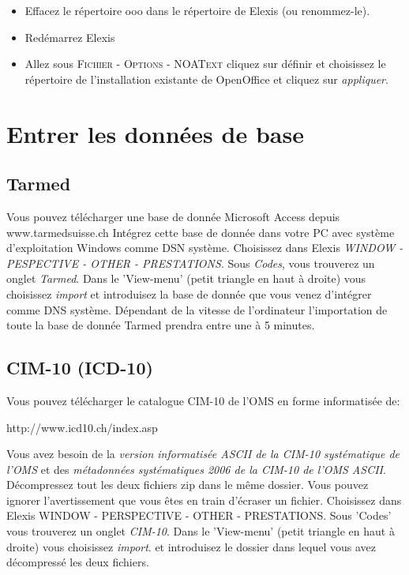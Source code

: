 \begin{itemize}
\item Effacez le répertoire ooo dans le répertoire de Elexis (ou renommez-le).
\item Redémarrez Elexis
\item Allez sous  \textsc{Fichier - Options - NOAText} cliquez sur \glqq définir\grqq{} et choisissez le répertoire de l'installation existante de OpenOffice et cliquez sur \textit{appliquer}.

\end{itemize}
\section{Entrer les données de base}
\subsection{Tarmed}
Vous pouvez télécharger une base de donnée Microsoft Access depuis www.tarmedsuisse.ch
Intégrez cette base de donnée dans votre PC avec système d'exploitation Windows comme DSN système. Choisissez dans Elexis \textit{WINDOW - PESPECTIVE - OTHER - PRESTATIONS}. Sous \textit{Codes}, vous trouverez un onglet  \textit{Tarmed}. Dans le 'View-menu' (petit triangle en haut à droite) vous choisissez \textit{import} et introduisez la base de donnée que vous venez d'intégrer comme DNS système. Dépendant de la vitesse de l'ordinateur l'importation de toute la base de donnée Tarmed prendra entre une à 5 minutes.

\subsection{CIM-10 (ICD-10)}
\label{config:icd10}
Vous pouvez télécharger le catalogue CIM-10 de l'OMS en forme informatisée de:

http://www.icd10.ch/index.asp

Vous avez besoin de la \textit{version informatisée ASCII de la CIM-10 systématique de l'OMS } et des \textit{métadonnées systématiques 2006 de la CIM-10 de l'OMS ASCII}. Décompressez tout les deux fichiers zip dans le même dossier. Vous pouvez ignorer l'avertissement que vous êtes en train d'écraser un fichier. Choisissez dans Elexis  WINDOW - PERSPECTIVE - OTHER - PRESTATIONS. Sous 'Codes' vous trouverez un onglet \textit{CIM-10}. Dans le 'View-menu' (petit triangle en haut à droite) vous choisissez  \textit{import}. et introduisez le dossier dans lequel vous avez décompressé les deux fichiers.


